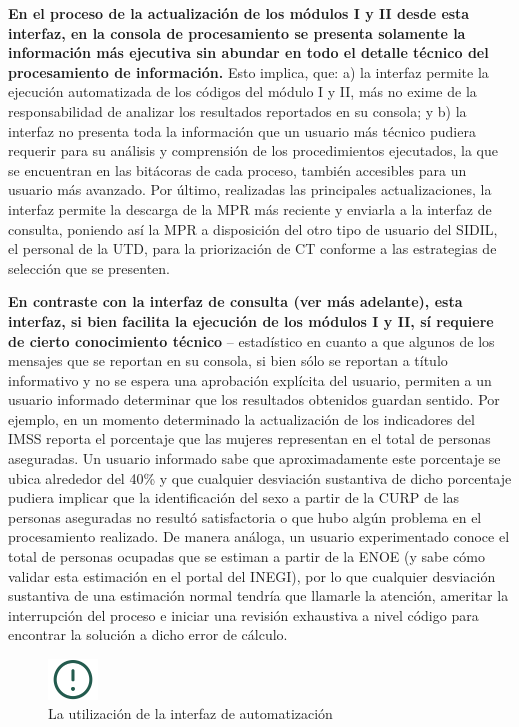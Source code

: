 \documentclass[
]{article}
\begin{document}
\textbf{En el proceso de la actualización de los módulos I y II desde esta interfaz, en la consola de procesamiento se presenta solamente la información más ejecutiva sin abundar en todo el detalle técnico del procesamiento de información.} Esto implica, que: a) la interfaz permite la ejecución automatizada de los códigos del módulo I y II, más no exime de la responsabilidad de analizar los resultados reportados en su consola; y b) la interfaz no presenta toda la información que un usuario más técnico pudiera requerir para su análisis y comprensión de los procedimientos ejecutados, la que se encuentran en las bitácoras de cada proceso, también accesibles para un usuario más avanzado. Por último, realizadas las principales actualizaciones, la interfaz permite la descarga de la MPR más reciente y enviarla a la interfaz de consulta, poniendo así la MPR a disposición del otro tipo de usuario del SIDIL, el personal de la UTD, para la priorización de CT conforme a las estrategias de selección que se presenten.

\textbf{En contraste con la interfaz de consulta (ver más adelante), esta interfaz, si bien facilita la ejecución de los módulos I y II, sí requiere de cierto conocimiento técnico} -- estadístico en cuanto a que algunos de los mensajes que se reportan en su consola, si bien sólo se reportan a título informativo y no se espera una aprobación explícita del usuario, permiten a un usuario informado determinar que los resultados obtenidos guardan sentido. Por ejemplo, en un momento determinado la actualización de los indicadores del IMSS reporta el porcentaje que las mujeres representan en el total de personas aseguradas. Un usuario informado sabe que aproximadamente este porcentaje se ubica alrededor del 40\% y que cualquier desviación sustantiva de dicho porcentaje pudiera implicar que la identificación del sexo a partir de la CURP de las personas aseguradas no resultó satisfactoria o que hubo algún problema en el procesamiento realizado. De manera análoga, un usuario experimentado conoce el total de personas ocupadas que se estiman a partir de la ENOE (y sabe cómo validar esta estimación en el portal del INEGI), por lo que cualquier desviación sustantiva de una estimación normal tendría que llamarle la atención, ameritar la interrupción del proceso e iniciar una revisión exhaustiva a nivel código para encontrar la solución a dicho error de cálculo.

\begin{figure}
\includegraphics[width=50px,style="float:left; background-color: #f5f5f5; padding-right:1em"]{images-1/important-icon} \caption{La utilización de la interfaz de automatización}\label{fig:utilizacioninterfazauto}
\end{figure}
\end{document}
